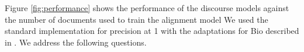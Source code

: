 %
%

Figure \ref{fig:performance} shows the performance of the discourse models against the number of documents used to train the alignment model
We used the standard implementation for precision at 1 \citep[P@1;][]{manning08} with the adaptations for Bio described in \citet{jansen14}. We address the following questions.

